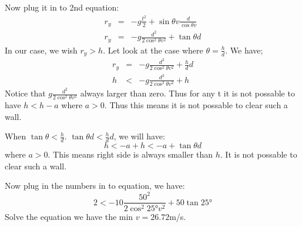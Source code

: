 \documentclass[aps,prl,reprint]{revtex4-1}
\begin{document}
Now plug it in to 2nd equation:
\begin{eqnarray*}
r_y &=& -g \frac{t^2}{2} + \sin\theta v \frac{d}{\cos\theta v} \\
r_y &=& -g \frac{d^2}{2\cos^2\theta v^2} + \tan\theta d
\end{eqnarray*}
In our case, we wish $r_y > h$. Let look at the case where $\theta = \frac{h}{d}$. We have;
\begin{eqnarray*}
r_y &=& -g \frac{d^2}{2\cos^2\theta v^2} + \frac{h}{d} d \\
h &<& -g \frac{d^2}{2\cos^2\theta v^2} + h
\end{eqnarray*}
Notice that $g \frac{d^2}{2\cos^2\theta v^2}$ always larger than zero. Thus for any t it is not possable to have $h < h - a$ where $a > 0$. Thus this means it is not possable to clear such a wall.

When $\tan\theta < \frac{h}{d}$. $\tan\theta d < \frac{h}{d} d$, we will have:
\[
h < -a + h< -a + \tan\theta d
\]
where $a > 0$. This means right side is always smaller than $h$. It is not possable to clear such a wall.

Now plug in the numbers in to equation, we have:
\[
2 < -10 \frac{50^2}{2\cos^2\ang{25} v^2} + 50 \tan\ang{25} 
\]
Solve the equation we have the min $v = 26.72$m/s.
\end{document}
